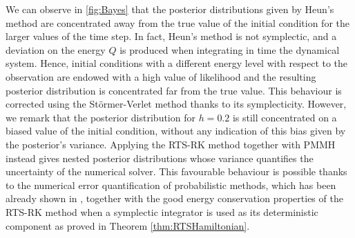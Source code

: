 \documentclass[10pt]{article}
\begin{document}
We can observe in \cref{fig:Bayes} that the posterior distributions given by Heun's method are concentrated away from the true value of the initial condition for the larger values of the time step. In fact, Heun's method is not symplectic, and a deviation on the energy $Q$ is produced when integrating in time the dynamical system. Hence, initial conditions with a different energy level with respect to the observation are endowed with a high value of likelihood and the resulting posterior distribution is concentrated far from the true value. This behaviour is corrected using the Störmer-Verlet method thanks to its symplecticity. However, we remark that the posterior distribution for $h = 0.2$ is still concentrated on a biased value of the initial condition, without any indication of this bias given by the posterior's variance. Applying the RTS-RK method together with PMMH instead gives nested posterior distributions whose variance quantifies the uncertainty of the numerical solver. This favourable behaviour is possible thanks to the numerical error quantification of probabilistic methods, which has been already shown in \cite{CGS16, COS17}, together with the good energy conservation properties of the RTS-RK method when a symplectic integrator is used as its deterministic component as proved in Theorem \cref{thm:RTSHamiltonian}.
\end{document}
